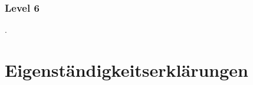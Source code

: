 \documentclass[a4paper 11pt]{article}
\begin{document}
\subsubsection{Level 6}

. 


\normalsize
\newpage

\appendix
\section{Eigenständigkeitserklärungen}

\end{document}
